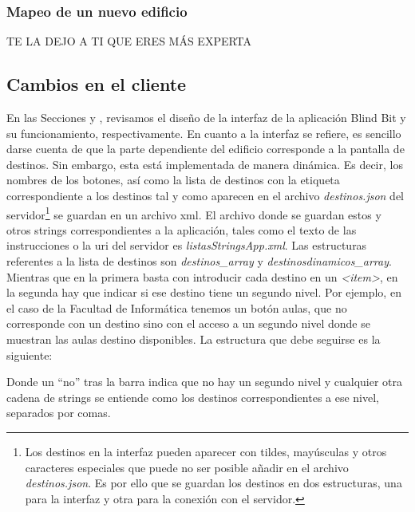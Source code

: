 \subsubsection{Mapeo de un nuevo edificio}

TE LA DEJO A TI QUE ERES MÁS EXPERTA



\subsection{Cambios en el cliente}

En las Secciones y , revisamos el diseño de la interfaz de la aplicación Blind Bit y su funcionamiento, respectivamente. En cuanto a la interfaz se refiere, es sencillo darse cuenta de que la parte dependiente del edificio corresponde a la pantalla de destinos. Sin embargo, esta está implementada de manera dinámica. Es decir, los nombres de los botones, así como la lista de destinos con la etiqueta correspondiente a los destinos tal y como aparecen en el archivo \textit{destinos.json} del servidor\footnote{Los destinos en la interfaz pueden aparecer con tildes, mayúsculas y otros caracteres especiales que puede no ser posible añadir en el archivo \textit{destinos.json}. Es por ello que se guardan los destinos en dos estructuras, una para la interfaz y otra para la conexión con el servidor.} se guardan en un archivo xml. El archivo donde se guardan estos y otros strings correspondientes a la aplicación, tales como el texto de las instrucciones o la uri del servidor es \textit{listasStringsApp.xml}. Las estructuras referentes a la lista de destinos son \textit{destinos\_array} y \textit{destinosdinamicos\_array}. Mientras que en la primera basta con introducir cada destino en un \textit{<item>}, en la segunda hay que indicar si ese destino tiene un segundo nivel. Por ejemplo, en el caso de la Facultad de Informática tenemos un botón aulas, que no corresponde con un destino sino con el acceso a un segundo nivel donde se muestran las aulas destino disponibles. La estructura que debe seguirse es la siguiente: 


 



Donde un ``no'' tras la barra indica que no hay un segundo nivel y cualquier otra cadena de strings se entiende como los destinos correspondientes a ese nivel, separados por comas.


